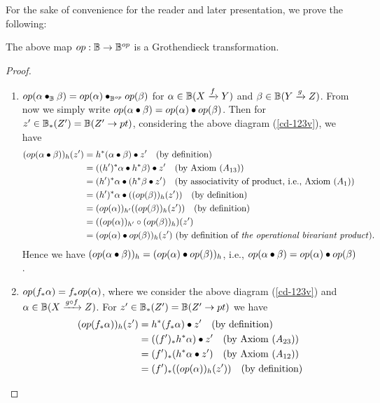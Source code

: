 \documentclass[a4paper]{amsart}
\begin{document}
For the sake of convenience for the reader and later presentation, we prove the following:
\begin{pro}\label{map op} The above map $ op:\mathbb B \to \mathbb B^{op}$ is a Grothendieck transformation.
\end{pro}
\begin{proof}
\begin{enumerate}
\item $op(\alpha \bullet_{\mathbb B} \beta) =op(\alpha) \bullet_{\mathbb B^{op}} op(\beta)$  for $\alpha \in \mathbb B(X \xrightarrow f  Y)$ and $\beta \in \mathbb B(Y \xrightarrow g  Z)$. From now we simply write $op(\alpha \bullet \beta) =op(\alpha) \bullet op(\beta)$. Then for $z' \in \mathbb B_*(Z') = \mathbb B(Z' \to pt)$, considering the above diagram (\ref{cd-123v}), we have 
\begin{align*}
(op(\alpha \bullet \beta))_h (z') & = h^*(\alpha \bullet \beta) \bullet z' \quad \text{(by definition)}\\
& = ((h')^*\alpha \bullet h^*\beta) \bullet z'  \quad \text{(by Axiom ($A_{13}$))}\\
& = (h')^*\alpha \bullet (h^*\beta \bullet z' ) \quad \text{(by associativity of product, i.e., Axiom ($A_1$))}\\
& =  (h')^*\alpha \bullet ((op(\beta))_h(z') )  \quad \text{(by definition)}\\
& =  (op(\alpha))_{h'}((op(\beta))_h(z')) \quad \text{(by definition)}\\
& =  ((op(\alpha))_{h'} \circ (op(\beta))_h) (z')  \\
& = (op(\alpha) \bullet op(\beta))_h (z')  \, \, \text{(by definition of \emph{the operational bivariant product}).}
\end{align*}
Hence we have $(op(\alpha \bullet \beta))_h  =  (op(\alpha) \bullet op(\beta))_h $, i.e., $op(\alpha \bullet \beta) =op(\alpha) \bullet op(\beta)$.
\item $op(f_*\alpha) = f_*op(\alpha)$, where we consider the above diagram (\ref{cd-123v}) and $\alpha \in \mathbb B(X \xrightarrow {g \circ f} Z)$. For $z' \in \mathbb B_*(Z')=\mathbb B(Z' \to pt)$ we have
\begin{align*}
(op(f_*\alp))_h (z') & = h^*(f_*\alp) \bullet z' \quad \text{(by definition)}\\
& =  ((f')_*h^*\alp) \bullet z'  \quad \text{(by Axiom ($A_{23}$))}\\
& =  (f')_* (h^*\alp \bullet z') \quad \text{(by  Axiom ($A_{12}$))}\\
& =  (f')_* ((op(\alp))_h(z'))  \quad \text{(by definition)}\\

\end{align*}
\end{enumerate}
\end{proof}
\end{document}
